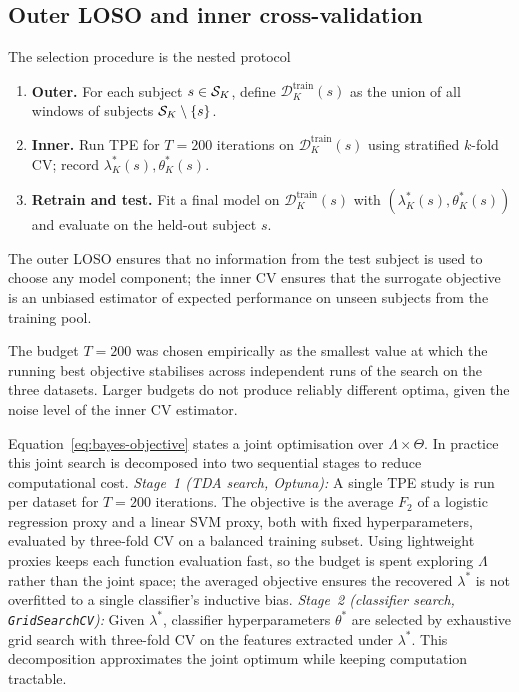 \subsection{Outer LOSO and inner cross-validation}
\label{subsubsec:nested-cv}

The selection procedure is the nested protocol
\begin{enumerate}[label=(\arabic*)]
  \item \textbf{Outer.} For each subject $s\in\mathcal{S}_K$, define $\mathcal{D}^{\mathrm{train}}_K(s)$ as the union of all windows of subjects $\mathcal{S}_K\setminus\{s\}$.
  \item \textbf{Inner.} Run TPE for $T=200$ iterations on $\mathcal{D}^{\mathrm{train}}_K(s)$ using stratified $k$-fold CV; record $\lambda^*_K(s),\theta^*_K(s)$.
  \item \textbf{Retrain and test.} Fit a final model on $\mathcal{D}^{\mathrm{train}}_K(s)$ with $(\lambda^*_K(s),\theta^*_K(s))$ and evaluate on the held-out subject $s$.
\end{enumerate}
The outer LOSO ensures that no information from the test subject is used to choose any model component; the inner CV ensures that the surrogate objective is an unbiased estimator of expected performance on unseen subjects from the training pool.

\begin{remark}
\label{rem:bayes-budget}
The budget $T=200$ was chosen empirically as the smallest value at which the running best objective stabilises across independent runs of the search on the three datasets. Larger budgets do not produce reliably different optima, given the noise level of the inner CV estimator.
\end{remark}

\begin{remark}
\label{rem:impl-decomp}
Equation~\eqref{eq:bayes-objective} states a joint optimisation over $\Lambda\times\Theta$.
In practice this joint search is decomposed into two sequential stages to reduce
computational cost.
\emph{Stage~1 (TDA search, Optuna):} A single TPE study is run per dataset for
$T=200$ iterations.
The objective is the average $F_2$ of a logistic regression proxy and a linear SVM
proxy, both with fixed hyperparameters, evaluated by three-fold CV on a balanced
training subset.
Using lightweight proxies keeps each function evaluation fast, so the budget is spent
exploring $\Lambda$ rather than the joint space; the averaged objective ensures the
recovered $\lambda^*$ is not overfitted to a single classifier's inductive bias.
\emph{Stage~2 (classifier search, \texttt{GridSearchCV}):} Given $\lambda^*$,
classifier hyperparameters $\theta^*$ are selected by exhaustive grid search with
three-fold CV on the features extracted under $\lambda^*$.
This decomposition approximates the joint optimum while keeping computation tractable.
\end{remark}

